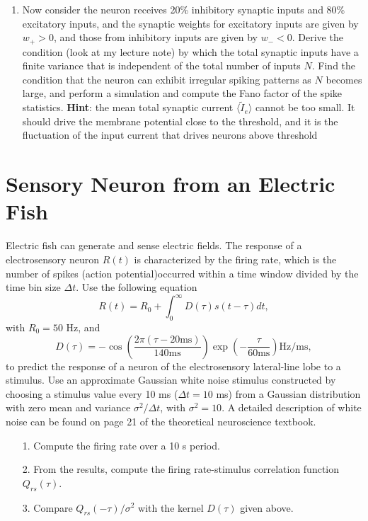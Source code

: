 \documentclass{article}
\begin{document}
{\begin{enumerate}
\item Now consider the neuron receives 20\% inhibitory synaptic inputs and 80\% excitatory inputs, and the synaptic weights for excitatory inputs are given by $w_+ > 0$, and those from inhibitory inputs are given by $w_- < 0$. Derive the condition (look at my lecture note) by which the total synaptic inputs have a finite variance that is independent of the total number of inputs $N$. Find the condition that the neuron can exhibit irregular spiking patterns as $N$ becomes large, and perform a simulation and compute the Fano factor of the spike statistics.   \textbf{Hint}: the mean total synaptic current $\langle \tilde{I}_e \rangle$ cannot be too small. It should drive the membrane potential close to the threshold, and it is the fluctuation of the input current that drives neurons above threshold \end{enumerate}


\section*{Sensory Neuron from an Electric Fish}
Electric fish can generate and sense electric fields. The response of a electrosensory neuron $R(t)$ is characterized by the firing rate, which is the number of spikes (action potential)occurred within a time window divided by the time bin size $\Delta t$.  Use the following equation 
\begin{equation}
R(t) = R_0 + \int_0^\infty D(\tau) s(t-\tau) dt,
\end{equation}
with $R_0 = 50$ Hz, and 
\begin{equation}
D(\tau) = -\cos (\frac{2\pi (\tau - 20 \mathrm{ ms})}{140 \mathrm{ ms}} )\exp ( - \frac{\tau}{60 \mathrm{ ms}} ) \mathrm{ Hz/ms},
\end{equation}
to predict the response of a neuron of the electrosensory lateral-line lobe to a stimulus. Use an approximate Gaussian white noise stimulus constructed by choosing a stimulus value every 10 ms ($\Delta t = 10$ ms) from a Gaussian distribution with zero mean and variance $\sigma^2 /\Delta t$, with $\sigma^2 =10$. A detailed description of white noise can be found on page 21 of the theoretical neuroscience textbook. 
\begin{enumerate}
\item[1.]Compute the firing rate over a 10 s period. 
\item[2.]From the results, compute the firing rate-stimulus correlation function $Q_{rs}(\tau)$. 
\item[3.]Compare $Q_{rs}(-\tau)/\sigma^2$ with the kernel $D(\tau)$ given above.
\end{enumerate}


}
\end{document}
